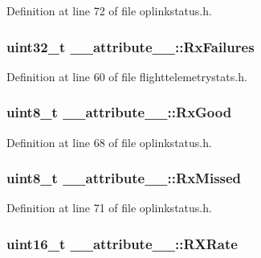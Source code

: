\-Definition at line 72 of file oplinkstatus.\-h.

\hypertarget{struct____attribute_____a88917b8950e17f24e5b6affa3c2c3189}{
\subsubsection[{\-Rx\-Failures}]{\setlength{\rightskip}{0pt plus 5cm}uint32\-\_\-t {\bf \-\_\-\-\_\-attribute\-\_\-\-\_\-\-::\-Rx\-Failures}}}\label{struct____attribute_____a88917b8950e17f24e5b6affa3c2c3189}


\-Definition at line 60 of file flighttelemetrystats.\-h.

\hypertarget{struct____attribute_____a04e8cd5b68bbba57eb9ee40986519a30}{
\subsubsection[{\-Rx\-Good}]{\setlength{\rightskip}{0pt plus 5cm}uint8\-\_\-t {\bf \-\_\-\-\_\-attribute\-\_\-\-\_\-\-::\-Rx\-Good}}}\label{struct____attribute_____a04e8cd5b68bbba57eb9ee40986519a30}


\-Definition at line 68 of file oplinkstatus.\-h.

\hypertarget{struct____attribute_____a9fdfd5bf8ab50c030f16b328ef266a0b}{
\subsubsection[{\-Rx\-Missed}]{\setlength{\rightskip}{0pt plus 5cm}uint8\-\_\-t {\bf \-\_\-\-\_\-attribute\-\_\-\-\_\-\-::\-Rx\-Missed}}}\label{struct____attribute_____a9fdfd5bf8ab50c030f16b328ef266a0b}


\-Definition at line 71 of file oplinkstatus.\-h.

\hypertarget{struct____attribute_____ad8c311968a754ceb7a6ea35061ba0be2}{
\subsubsection[{\-R\-X\-Rate}]{\setlength{\rightskip}{0pt plus 5cm}uint16\-\_\-t {\bf \-\_\-\-\_\-attribute\-\_\-\-\_\-\-::\-R\-X\-Rate}}}\label{struct____attribute_____ad8c311968a754ceb7a6ea35061ba0be2}


